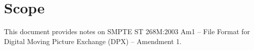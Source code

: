 \cleardoublepage
\numberedformat	
\chapter{Scope} 	%

This document provides notes on SMPTE ST 268M:2003 Am1 -- File Format for Digital Moving Picture Exchange (DPX) -- Amendment 1.
